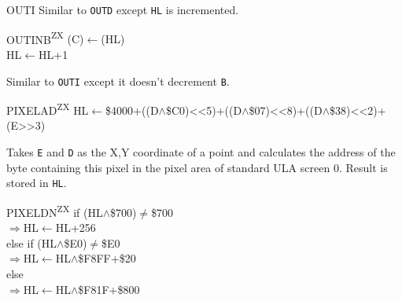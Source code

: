 \documentclass[12pt,twoside,openright,a4paper]{book}
\newcommand{\ZXN}{\textnormal{\textsuperscript{ZX}}}
\begin{document}
\begin{basedescript}{
	\desclabelstyle{\multilinelabel}
	\desclabelwidth{3cm}}
\begin{detailitem}{OUTI}
		Similar to {\tt OUTD} except {\tt HL} is incremented.
		
		\begin{DetailEffects}
		\end{DetailEffects}
				
		\begin{DetailTiming}
			\DetailTime{}{4}{16}
		\end{DetailTiming}

	\end{detailitem}

	\begin{detailitem}{OUTINB\ZXN}
		{(C)$\leftarrow$(HL)\\
		HL$\leftarrow$HL+1}

		Similar to {\tt OUTI} except it doesn't decrement {\tt B}.

		\begin{DetailEffects}
			\DetailFlags{\FU}{\FU}{\FU}{\FU}{\FU}{\FU}
		\end{DetailEffects}
				
		\begin{DetailTiming}
		\end{DetailTiming}

	\end{detailitem}

	\begin{detailitem}{PIXELAD\ZXN}
		{HL$\leftarrow$\$4000+((D$\wedge$\$C0)<<5)+((D$\wedge$\$07)<<8)+((D$\wedge$\$38)<<2)+(E>>3)}

		Takes {\tt E} and {\tt D} as the X,Y coordinate of a point and calculates the address of the byte containing this pixel in the pixel area of standard ULA screen 0. Result is stored in {\tt HL}.

		\DetailNoEffect
				
		\begin{DetailTiming}
			\DetailTime{}{2}{8}
		\end{DetailTiming}

	\end{detailitem}
	
	\pagebreak
	\begin{detailitem}{PIXELDN\ZXN}
		{if (HL$\wedge$\$700)$\neq$\$700\\
		$\Rightarrow$HL$\leftarrow$HL+256\\
		else if (HL$\wedge$\$E0)$\neq$\$E0\\
		$\Rightarrow$HL$\leftarrow$HL$\wedge$\$F8FF+\$20\\
		else\\
		$\Rightarrow$HL$\leftarrow$HL$\wedge$\$F81F+\$800}


\end{detailitem}
\end{basedescript}
\end{document}
